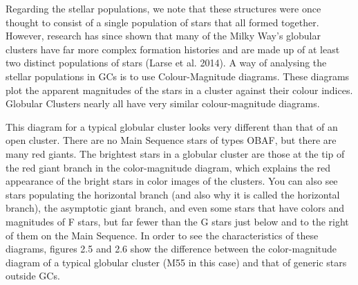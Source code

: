 Regarding the stellar populations, we note that these structures were once thought to consist of a single population of stars that all formed together. However, research has since shown that many of the Milky Way's globular clusters have far more complex formation histories and are made up of at least two distinct populations of stars (Larse et al. 2014). A way of analysing the stellar populations in GCs is to use Colour-Magnitude diagrams. These diagrams plot the apparent magnitudes of the stars in a cluster against their colour indices. Globular Clusters nearly all have very similar colour-magnitude diagrams.

This diagram for a typical globular cluster looks very different than that of an open cluster. There are no Main Sequence stars of types OBAF, but there are many red giants. The brightest stars in a globular cluster are those at the tip of the red giant branch in the color-magnitude diagram, which explains the red appearance of the bright stars in color images of the clusters. You can also see stars populating the horizontal branch (and also why it is called the horizontal branch), the asymptotic giant branch, and even some stars that have colors and magnitudes of F stars, but far fewer than the G stars just below and to the right of them on the Main Sequence. In order to see the characteristics of these diagrams, figures 2.5 and 2.6 show the difference between the color-magnitude diagram of a typical globular cluster (M55 in this case) and that of generic stars outside GCs.

